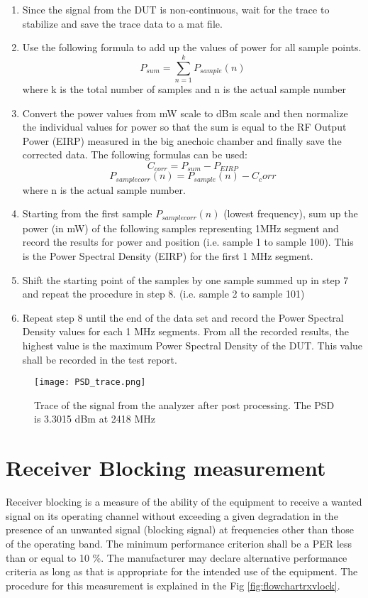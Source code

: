 \begin{enumerate}
\item Since the signal from the \acs{DUT} is non-continuous, wait for the trace to stabilize and save the trace data to a mat file.
 
 \item Use the following formula to add up the values of power for all sample points.
  $$ P_{sum} = \sum_{n=1}^{k} P_{sample}(n) $$ where k is the total number of samples and n is the actual sample number
  
 \item  Convert the power values from mW scale to dBm scale and then normalize the individual values for power so that the sum is equal to the RF Output Power (\acs{EIRP}) measured in the big anechoic chamber and finally save the corrected data. The following formulas can be used:
  $$C_{corr} = P_{sum} - P_{EIRP}   $$ 
  $$P_{samplecorr}(n) = P_{sample}(n) - C_corr $$ where n is the actual sample number.
  
  \item Starting from the first sample $P_{samplecorr}(n)$ (lowest frequency), sum up the power (in mW) of the following samples representing 1MHz segment and record the results for power and position (i.e. sample 1 to sample 100). This is the Power Spectral Density (\acs{EIRP}) for the first 1 MHz segment.
  
  \item Shift the starting point of the samples by one sample summed up in step 7 and repeat the procedure in step 8. (i.e. sample 2 to sample 101)
  
  \item Repeat step 8 until the end of the data set and record the Power Spectral Density values for each 1 MHz segments. From all the recorded results, the highest value is the maximum Power Spectral Density of the DUT. This value shall be recorded in the test report.
    \end{enumerate}
  
 \begin{figure}[H]
\centering
\texttt{[image: PSD\_trace.png]}
\caption{Trace of the signal from the analyzer after post processing. The \acs{PSD} is 3.3015 dBm at 2418 MHz}
\label{fig:psdtraceI}
\end{figure}
  
  
 \section{Receiver Blocking measurement}
\label{sec:rxmeas} 
Receiver blocking is a measure of the ability of the equipment to receive a wanted signal on its operating channel without exceeding a given degradation in the presence of an unwanted signal (blocking signal) at frequencies other than those of the operating band. The minimum performance criterion shall be a \ac{PER} less than or equal to 10 \%. The manufacturer may declare alternative performance criteria as long as that is appropriate for the intended use of the equipment. The procedure for this measurement is explained in the Fig \ref{fig:flowchartrxvlock}.

